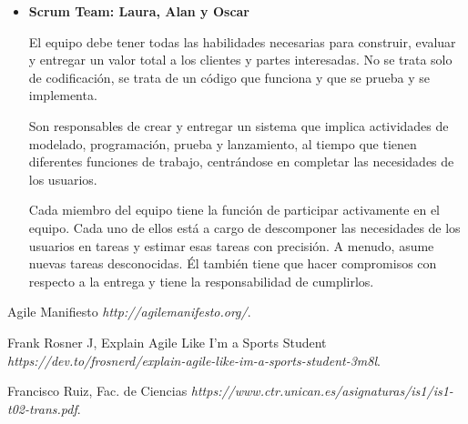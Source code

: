 \documentclass[12pt, fleqn]{report}                             %
\theoremstyle{break}                                            %
\begin{document}
\begin{itemize}
            \clearpage
            
            \item
                \textbf{Scrum Team: Laura, Alan y Oscar}
                
                El equipo debe tener todas las habilidades necesarias para construir, evaluar y entregar un valor total a los clientes y partes interesadas. No se trata solo de codificación, se trata de un código que funciona y que se prueba y se implementa.

 

                Son responsables de crear y entregar un sistema que implica actividades de modelado, programación, prueba y lanzamiento, al tiempo que tienen diferentes funciones de trabajo, centrándose en completar las necesidades de los usuarios.

                Cada miembro del equipo tiene la función de participar activamente en el equipo. Cada uno de ellos está a cargo de descomponer las necesidades de los usuarios en tareas y estimar esas tareas con precisión. A menudo, asume nuevas tareas desconocidas. Él también tiene que hacer compromisos con respecto a la entrega y tiene la responsabilidad de cumplirlos.
        
        \end{itemize}
	


    




\begin{thebibliography}{10}

        Agile Manifiesto
        \textit{http://agilemanifesto.org/}. 

    	Frank Rosner J, Explain Agile Like I'm a Sports Student 
        \textit{https://dev.to/frosnerd/explain-agile-like-im-a-sports-student-3m8l}. 
        
        Francisco Ruiz, Fac. de Ciencias
        \textit{https://www.ctr.unican.es/asignaturas/is1/is1-t02-trans.pdf}. 

\end{thebibliography}
\end{document}
